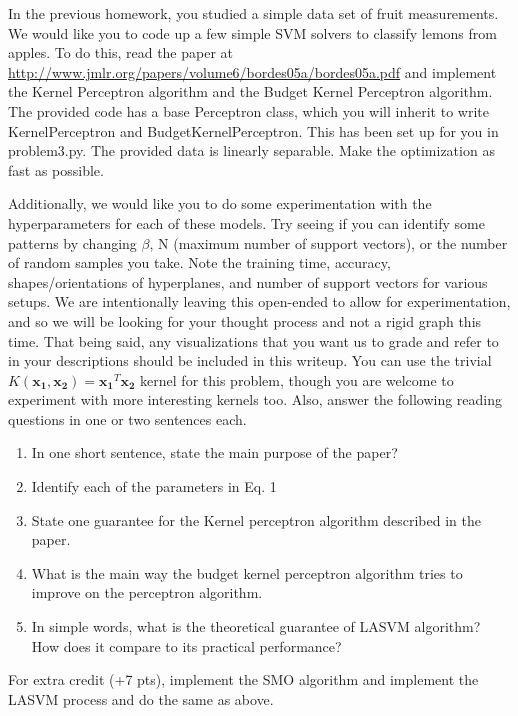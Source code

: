 \documentclass[submit]{harvardml}
\begin{document}
\newpage
\begin{problem}



In the previous homework, you studied a simple data set of fruit measurements.
We would like you to code up a few simple SVM solvers to classify lemons from
apples. To do this, read the paper at
\url{http://www.jmlr.org/papers/volume6/bordes05a/bordes05a.pdf} and implement
the Kernel Perceptron algorithm and the Budget Kernel Perceptron algorithm. The provided code has a base Perceptron class, which you will inherit to write KernelPerceptron and BudgetKernelPerceptron. This has been set up for you in problem3.py. The provided data is linearly separable. Make the optimization as fast as
possible. 

Additionally, we would like you to do some experimentation with the hyperparameters for each of these models. Try seeing if you can identify some patterns by changing $\beta$, N (maximum number of support vectors), or the number of random samples you take.  Note the training time, accuracy,  shapes/orientations of hyperplanes, and number of support vectors for various setups. We are intentionally leaving this open-ended to allow for experimentation, and so we will be looking for your thought process and not a rigid graph this time. That being said, any visualizations that you want us to grade and refer to in your descriptions should be included in this writeup. You can use the trivial $K(\mathbf{x_1}, \mathbf{x_2}) = \mathbf{x_1}^T\mathbf{x_2}$ kernel for this problem, though you are welcome to experiment with more interesting kernels too. Also, answer the following reading questions in one or two sentences each.

\begin{enumerate}
\item In one short sentence, state the main purpose of the paper?
\item Identify each of the parameters in Eq. 1
\item State one guarantee for the Kernel perceptron algorithm described in the
  paper.
\item What is the main way the budget kernel perceptron algorithm tries to
  improve on the perceptron algorithm.
\item In simple words, what is the theoretical guarantee of LASVM algorithm? How
  does it compare to its practical performance?
\end{enumerate}


For extra credit (+7 pts), implement the SMO algorithm and implement the LASVM process and do the same as above.


\end{problem}
\end{document}
